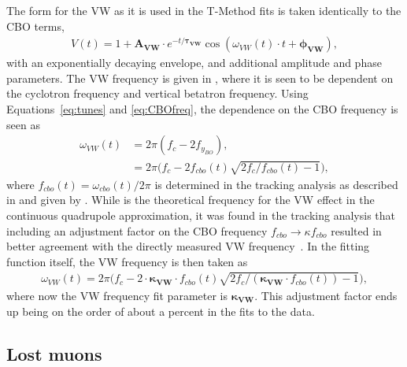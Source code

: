 The form for the VW as it is used in the T-Method fits is taken identically to the CBO terms, 
    \begin{align} \label{eq:VWterm}
        V(t) = 1 + \boldsymbol{A_{VW}} \cdot e^{-t/\boldsymbol{\tau_{VW}}} \cos(\omega_{VW}(t) \cdot t + \boldsymbol{\phi_{VW}}), 
    \end{align}
with an exponentially decaying envelope, and additional amplitude and phase parameters. The VW frequency is given in , where it is seen to be dependent on the cyclotron frequency and vertical betatron frequency. Using Equations~\ref{eq:tunes} and \ref{eq:CBOfreq}, the dependence on the CBO frequency is seen as
    \begin{equation}
    \begin{aligned}
        \omega_{VW}(t) &= 2\pi (f_{c} - 2f_{y_{BO}}), \\
                    &= 2\pi \Big(f_{c} - 2f_{cbo}(t)\sqrt{2f_{c}/f_{cbo}(t)-1}\Big),
    \label{eq:VWfreqOne}
    \end{aligned}
    \end{equation}
where $f_{cbo}(t) = \omega_{cbo}(t)/2\pi$ is determined in the tracking analysis as described in  and given by . While  is the theoretical frequency for the VW effect in the continuous quadrupole approximation, it was found in the tracking analysis that including an adjustment factor on the CBO frequency $f_{cbo} \rightarrow \kappa f_{cbo}$ resulted in better agreement with the directly measured VW frequency~\cite{cbofrequency,verticalbetatron}. In the fitting function itself, the VW frequency is then taken as
    \begin{align} \label{eq:VWfreqKappa}
        \omega_{VW}(t) = 2\pi \Big(f_{c} - 2 \cdot \boldsymbol{\kappa_{VW}} \cdot f_{cbo}(t)\sqrt{2f_{c}/(\boldsymbol{\kappa_{VW}} \cdot f_{cbo}(t))-1}\Big),
    \end{align}
where now the VW frequency fit parameter is $\boldsymbol{\kappa_{VW}}$. This adjustment factor ends up being on the order of about a percent in the fits to the data.




\subsection{Lost muons}
\label{subsec:lostmuons}


